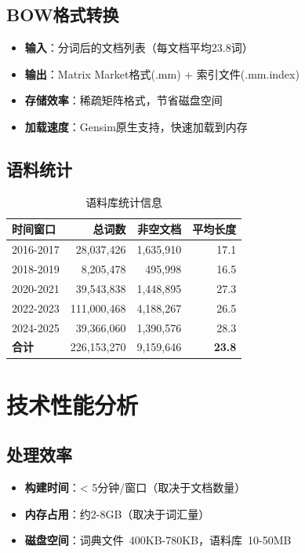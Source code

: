 \documentclass[11pt,a4paper]{article}
\begin{document}
\subsection{BOW格式转换}

\begin{itemize}
    \item \textbf{输入}：分词后的文档列表（每文档平均23.8词）
    \item \textbf{输出}：Matrix Market格式(.mm) + 索引文件(.mm.index)
    \item \textbf{存储效率}：稀疏矩阵格式，节省磁盘空间
    \item \textbf{加载速度}：Gensim原生支持，快速加载到内存
\end{itemize}

\subsection{语料统计}

\begin{table}[h]
\centering
\begin{tabular}{lrrr}
\toprule
\textbf{时间窗口} & \textbf{总词数} & \textbf{非空文档} & \textbf{平均长度} \\
\midrule
2016-2017 & 28,037,426 & 1,635,910 & 17.1 \\
2018-2019 & 8,205,478 & 495,998 & 16.5 \\
2020-2021 & 39,543,838 & 1,448,895 & 27.3 \\
2022-2023 & 111,000,468 & 4,188,267 & 26.5 \\
2024-2025 & 39,366,060 & 1,390,576 & 28.3 \\
\midrule
\textbf{合计} & 226,153,270 & 9,159,646 & \textbf{23.8} \\
\bottomrule
\end{tabular}
\caption{语料库统计信息}
\end{table}

\section{技术性能分析}

\subsection{处理效率}

\begin{itemize}
    \item \textbf{构建时间}：< 5分钟/窗口（取决于文档数量）
    \item \textbf{内存占用}：约2-8GB（取决于词汇量）
    \item \textbf{磁盘空间}：词典文件~400KB-780KB，语料库~10-50MB
\end{itemize}
\end{document}

